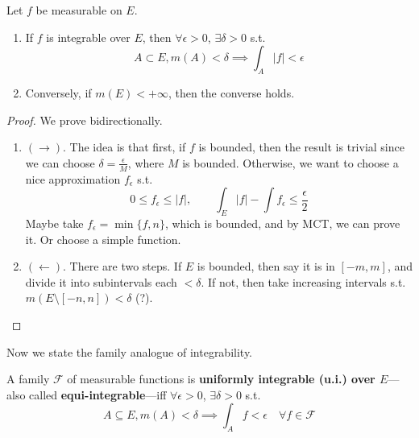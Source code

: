   \begin{theorem}
    Let $f$ be measurable on $E$. 
    \begin{enumerate}
      \item If $f$ is integrable over $E$, then $\forall \epsilon > 0$, $\exists \delta > 0$ s.t. 
      \begin{equation}
        A \subset E, m(A) < \delta \implies \int_A |f| < \epsilon
      \end{equation}

      \item Conversely, if $m(E) < +\infty$, then the converse holds. 
    \end{enumerate}
  \end{theorem}
  \begin{proof}
    We prove bidirectionally. 
    \begin{enumerate}
      \item $(\rightarrow)$. The idea is that first, if $f$ is bounded, then the result is trivial since we can choose $\delta = \frac{\epsilon}{M}$, where $M$ is bounded. Otherwise, we want to choose a nice approximation $f_\epsilon$ s.t. 
      \begin{equation}
        0 \leq f_\epsilon \leq |f|, \qquad \int_E |f| - \int f_\epsilon \leq \frac{\epsilon}{2}
      \end{equation}
      Maybe take $f_\epsilon = \min\{f, n\}$, which is bounded, and by MCT, we can prove it. Or choose a simple function.  

      \item $(\leftarrow)$. There are two steps. If $E$ is bounded, then say it is in $[-m, m]$, and divide it into subintervals each $< \delta$. If not, then take increasing intervals s.t. $m(E \setminus [-n, n]) < \delta$ (?). 
    \end{enumerate}
  \end{proof}

  Now we state the family analogue of integrability. 

  \begin{definition}
    A family $\mathscr{F}$ of measurable functions is \textbf{uniformly integrable (u.i.) over $E$}---also called \textbf{equi-integrable}---iff $\forall \epsilon > 0$, $\exists \delta > 0$ s.t. 
    \begin{equation}
      A \subseteq E, m(A) < \delta \implies \int_A f < \epsilon \quad \forall f \in \mathscr{F}
    \end{equation}
  \end{definition}

